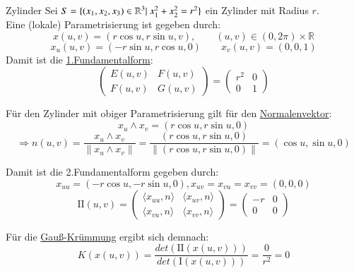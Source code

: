 \begin{titleDef}{Zylinder}
\label{zylinder}
Sei $S=\{(x_1,x_2,x_3)\in\Rthree|\ x_1^2+x_2^2=r^2\}$ ein Zylinder mit Radius $r$.\\
Eine (lokale) Parametrisierung ist gegeben durch:
$$x(u,v)=(r\cos u,r\sin u,v),\qquad (u,v)\in(0,2\pi)\times\mathbb{R}$$
$$x_u(u,v)=(-r\sin u,r\cos u,0)\qquad x_v(u,v)=(0,0,1)$$
Damit ist die \hyperref[fundamentalformEins]{1.Fundamentalform}:
$$\begin{pmatrix}
	E(u,v)&F(u,v)\\
	F(u,v)&G(u,v)
\end{pmatrix}=
\begin{pmatrix}
	r^2&0\\
	0&1
\end{pmatrix}$$
\par
Für den Zylinder mit obiger Parametrisierung gilt für den \hyperref[normalenvektor]{Normalenvektor}:
$$x_u\wedge x_v=(r\cos u,r\sin u,0)$$
$$\Longrightarrow n(u,v)=\frac{x_u\wedge x_v}{\lVert x_u\wedge x_v\rVert}=\frac{(r\cos u,r\sin u,0)}{\lVert (r\cos u,r\sin u,0)\rVert}=(\cos u,\sin u,0)$$
\par
Damit ist die 2.Fundamentalform gegeben durch:
$$x_{uu}=(-r\cos u, -r\sin u,0),x_{uv}=x_{vu}=x_{vv}=(0,0,0)$$
$$\mathrm{II}(u,v)=
\begin{pmatrix} 
	\langle x_{uu},n\rangle & \langle x_{uv},n\rangle\\
	\langle x_{vu},n\rangle & \langle x_{vv},n\rangle
\end{pmatrix}=
\begin{pmatrix}
	-r&0\\
	0&0
\end{pmatrix}$$
\par
Für die \hyperref[gausskruemmung]{Gauß-Krümmung} ergibt sich demnach:
$$K(x(u,v))=\frac{det(\mathrm{II}(x(u,v)))}{det(\mathrm{I}(x(u,v)))}=\frac{0}{r^2}=0$$
\end{titleDef}


